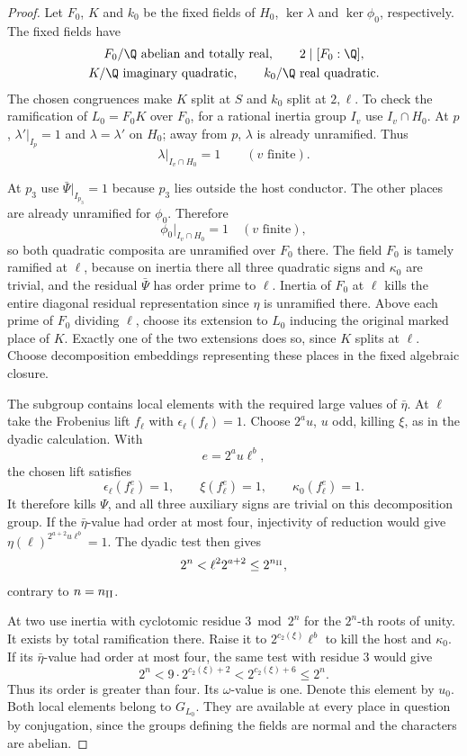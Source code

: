\begin{proof}
Let \(F_0\), \(K\) and \(k_0\) be the fixed
fields of \(H_0\), \(\ker\lambda\) and \(\ker\phi_0\),
respectively. The fixed fields have
\[
 \begin{gathered}
 F_0/\Q\text{ abelian and totally real},\qquad 2\mid[F_0:\Q],\\
 K/\Q\text{ imaginary quadratic},\qquad
 k_0/\Q\text{ real quadratic}.
 \end{gathered}
\]
The chosen congruences make \(K\) split at \(S\) and \(k_0\)
split at \(2,\ell\). To check the ramification of \(L_0=F_0K\) over \(F_0\),
for a rational inertia group \(I_v\) use \(I_v\cap H_0\).
At \(p\), \(\lambda'|_{I_p}=1\) and
\(\lambda=\lambda'\) on \(H_0\); away from \(p\), \(\lambda\)
is already unramified. Thus
\[
                   \lambda|_{I_v\cap H_0}=1
                         \qquad(v\text{ finite}).
\]

At \(p_3\) use \(\bar\Psi|_{I_{p_3}}=1\) because \(p_3\) lies
outside the host conductor. The other places are already unramified
for \(\phi_0\). Therefore
\[
 \phi_0|_{I_v\cap H_0}=1\quad(v\text{ finite}),
\]
so both quadratic composita are unramified over \(F_0\) there. The field \(F_0\) is tamely
ramified at \(\ell\), because on inertia there all
three quadratic signs and \(\kappa_0\) are trivial,
and the residual \(\bar\Psi\) has order prime to
\(\ell\). Inertia of \(F_0\) at \(\ell\) kills the
entire diagonal residual representation since
\(\eta\) is unramified there. Above each prime of
\(F_0\) dividing \(\ell\), choose its extension to
\(L_0\) inducing the original marked place of \(K\).
Exactly one of the two extensions does so, since
\(K\) splits at \(\ell\). Choose decomposition
embeddings representing these places in the fixed
algebraic closure.

The subgroup contains local elements with the
required large values of \(\bar\eta\). At \(\ell\) take
the Frobenius lift \(f_\ell\) with \(\epsilon_\ell(f_\ell)=1\).
Choose \(2^a u\), \(u\) odd, killing \(\xi\), as in
the dyadic calculation. With
\[
 e=2^a u\ell^b,
\]
the chosen lift satisfies
\[
 \epsilon_\ell(f_\ell^e)=1,\qquad
 \xi(f_\ell^e)=1,\qquad \kappa_0(f_\ell^e)=1.
\]
It therefore kills \(\Psi\), and all three auxiliary signs are trivial on this decomposition group. If the \(\bar\eta\)-value had order at most four, injectivity
of reduction would give \(\eta(\ell)^{2^{a+2}u\ell^b}=1\).
The dyadic test then gives
\[
                 2^n<\ell^2 2^{a+2}\le 2^{n_{\rm II}},
\]
contrary to \(n=n_{\rm II}\).

At two use inertia with cyclotomic
residue \(3\bmod 2^n\) for the \(2^n\)-th roots
of unity. It exists by total ramification there.
Raise it to \(2^{c_2(\xi)}\ell^b\) to kill the
host and \(\kappa_0\). If its \(\bar\eta\)-value had order at most four, the same
test with residue \(3\) would give
\[
       2^n<9\cdot2^{c_2(\xi)+2}<2^{c_2(\xi)+6}\le 2^n .
\]
Thus its order is greater than four.
Its \(\omega\)-value is one. Denote this element by
\(u_0\). Both local elements belong to \(G_{L_0}\).
They are available at every place in question by
conjugation, since the groups defining the fields
are normal and the characters are abelian.


\end{proof}
